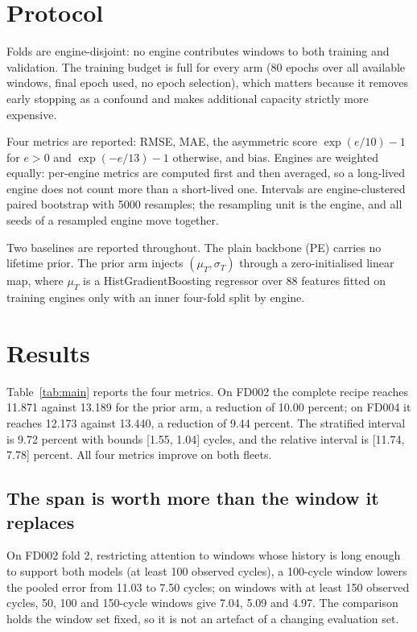 \documentclass[journal]{IEEEtran}
\begin{document}
\section{Protocol}\label{sec:protocol}

Folds are engine-disjoint: no engine contributes windows to both training and validation. The training budget is full for every arm (80 epochs over all available windows, final epoch used, no epoch selection), which matters because it removes early stopping as a confound and makes additional capacity strictly more expensive.

Four metrics are reported: RMSE, MAE, the asymmetric score $\exp(e/10)-1$ for $e>0$ and $\exp(-e/13)-1$ otherwise, and bias. Engines are weighted equally: per-engine metrics are computed first and then averaged, so a long-lived engine does not count more than a short-lived one. Intervals are engine-clustered paired bootstrap with 5000 resamples; the resampling unit is the engine, and all seeds of a resampled engine move together.

Two baselines are reported throughout. The plain backbone (PE) carries no lifetime prior. The prior arm injects $(\mu_T,\sigma_T)$ through a zero-initialised linear map, where $\mu_T$ is a HistGradientBoosting regressor over 88 features fitted on training engines only with an inner four-fold split by engine.

\section{Results}\label{sec:results}



Table~\ref{tab:main} reports the four metrics. On FD002 the complete recipe reaches 11.871 against 13.189 for the prior arm, a reduction of 10.00 percent; on FD004 it reaches 12.173 against 13.440, a reduction of 9.44 percent. The stratified interval is 9.72 percent with bounds [1.55, 1.04] cycles, and the relative interval is [11.74, 7.78] percent. All four metrics improve on both fleets.

\subsection{The span is worth more than the window it replaces}
On FD002 fold 2, restricting attention to windows whose history is long enough to support both models (at least 100 observed cycles), a 100-cycle window lowers the pooled error from 11.03 to 7.50 cycles; on windows with at least 150 observed cycles, 50, 100 and 150-cycle windows give 7.04, 5.09 and 4.97. The comparison holds the window set fixed, so it is not an artefact of a changing evaluation set.
\end{document}
